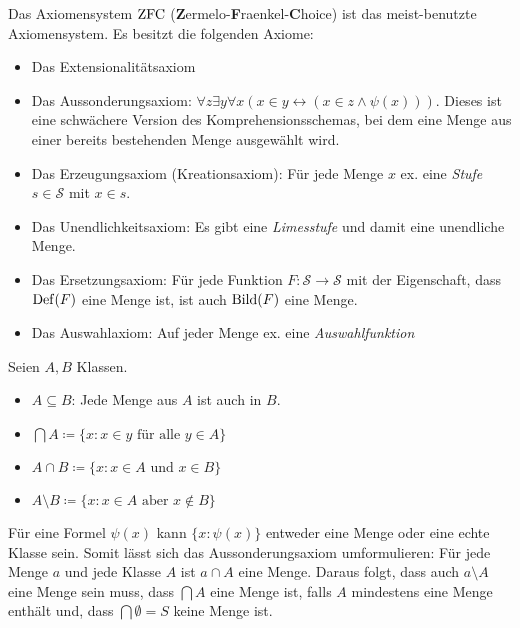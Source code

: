 \begin{definition}
	Das Axiomensystem $\operatorname{ZFC}$ (\textbf{Z}ermelo-\textbf{F}raenkel-\textbf{C}hoice) ist das meist-benutzte Axiomensystem. Es besitzt die folgenden Axiome:
	\begin{itemize}
		\item Das Extensionalitätsaxiom
		\item Das Aussonderungsaxiom: $\forall z \exists y \forall x (x\in y \leftrightarrow(x\in z \land \psi(x)))$. Dieses ist eine schwächere Version des Komprehensionsschemas, bei dem eine Menge aus einer bereits bestehenden Menge ausgewählt wird.
		\item Das Erzeugungsaxiom (Kreationsaxiom): Für jede Menge $x$ ex. eine \textit{Stufe} $s\in \mathcal{S}$ mit $x\in s$.
		\item Das Unendlichkeitsaxiom: Es gibt eine \textit{Limesstufe} und damit eine unendliche Menge.
		\item Das Ersetzungsaxiom: Für jede Funktion $F:\mathcal{S}\to \mathcal{S}$ mit der Eigenschaft, dass $\operatorname{Def}(F)$ eine Menge ist, ist auch $\operatorname{Bild}(F)$ eine Menge.
		\item Das Auswahlaxiom: Auf jeder Menge ex. eine \textit{Auswahlfunktion}
	\end{itemize}
\end{definition}

\begin{definition}[Klassenoperatoren]
	Seien $A, B$ Klassen.
	\begin{itemize}
		\item $A \subseteq B$: Jede Menge aus $A$ ist auch in $B$.
		\item $\bigcap A\coloneqq\{x : x\in y \text{ für alle } y \in A\}$
		\item $A \cap B \coloneqq \{x : x\in A \text{ und } x \in B\}$
		\item $A \setminus B \coloneqq \{x : x \in A \text{ aber } x \notin B\}$
	\end{itemize}
\end{definition}

Für eine Formel $\psi(x)$ kann $\{x : \psi(x)\}$ entweder eine Menge oder eine echte Klasse sein. Somit lässt sich das Aussonderungsaxiom umformulieren: Für jede Menge $a$ und jede Klasse $A$ ist $a \cap A$ eine Menge. Daraus folgt, dass auch $a \setminus A$ eine Menge sein muss, dass $\bigcap A$ eine Menge ist, falls $A$ mindestens eine Menge enthält und, dass $\bigcap \emptyset = S$ keine Menge ist.


